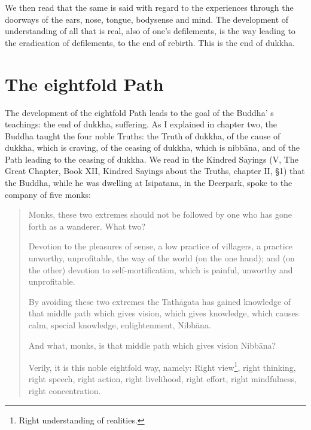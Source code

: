 \documentclass{book}
\begin{document}
We then read that the same is said with regard to the experiences
through the doorways of the ears, nose, tongue, bodysense and mind. The
development of under­standing of all that is real, also of one's
defilements, is the way leading to the eradication of defilements, to
the end of rebirth. This is the end of dukkha.

\chapter{The eightfold Path}

The development of the eightfold Path leads to the goal of the Buddha' s
teachings: the end of dukkha, suffering. As I explained in chapter two,
the Buddha taught the four noble Truths: the Truth of dukkha, of the
cause of dukkha, which is craving, of the ceasing of dukkha, which is
nib­bāna, and of the Path leading to the ceasing of dukkha. We read in
the Kindred Sayings (V, The Great Chapter, Book XII, Kindred Sayings
about the Truths, chapter II, §1) that the Buddha, while he was dwelling
at Isipatana, in the Deer­park, spoke to the company of five monks:

\begin{quote}
Monks, these two extremes should not be followed by one who has gone
forth as a wanderer. What two?

Devotion to the pleasures of sense, a low practice of villagers, a
practice unworthy, unprofitable, the way of the world (on the one hand);
and (on the other) devotion to self-mortification, which is painful,
unworthy and unprofitable.

By avoiding these two extremes the Tathāgata has gained knowledge of
that middle path which gives vision, which gives knowledge, which causes
calm, special knowledge, enlightenment, Nibbāna.

And what, monks, is that middle path which gives vision Nibbāna?

Verily, it is this noble eightfold way, namely: Right view\footnote{
  Right understanding of realities.}, right thinking, right speech,
right action, right livelihood, right effort, right mindfulness, right
concentration.
\end{quote}
\end{document}
